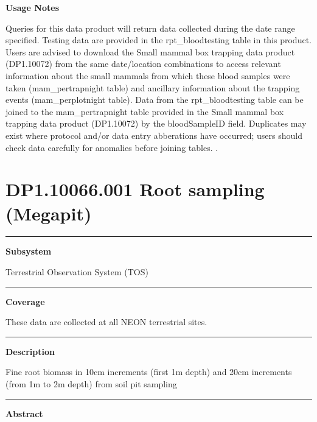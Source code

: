 \documentclass[]{article}
\begin{document}
\textbf{Usage Notes}

Queries for this data product will return data collected during the date
range specified. Testing data are provided in the rpt\_bloodtesting
table in this product. Users are advised to download the Small mammal
box trapping data product (DP1.10072) from the same date/location
combinations to access relevant information about the small mammals from
which these blood samples were taken (mam\_pertrapnight table) and
ancillary information about the trapping events (mam\_perplotnight
table). Data from the rpt\_bloodtesting table can be joined to the
mam\_pertrapnight table provided in the Small mammal box trapping data
product (DP1.10072) by the bloodSampleID field. Duplicates may exist
where protocol and/or data entry abberations have occurred; users should
check data carefully for anomalies before joining tables. \newpage
.

\section{DP1.10066.001 Root sampling
(Megapit)}\label{dp1.10066.001-root-sampling-megapit}

\begin{center}\rule{0.5\linewidth}{\linethickness}\end{center}

\textbf{Subsystem}

Terrestrial Observation System (TOS)

\begin{center}\rule{0.5\linewidth}{\linethickness}\end{center}

\textbf{Coverage}

These data are collected at all NEON terrestrial sites.

\begin{center}\rule{0.5\linewidth}{\linethickness}\end{center}

\textbf{Description}

Fine root biomass in 10cm increments (first 1m depth) and 20cm
increments (from 1m to 2m depth) from soil pit sampling

\begin{center}\rule{0.5\linewidth}{\linethickness}\end{center}

\textbf{Abstract}
\end{document}
